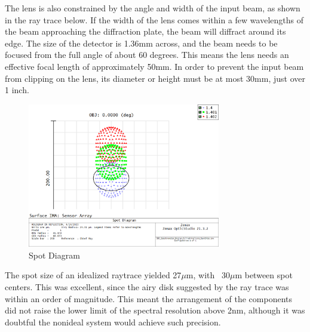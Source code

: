 The lens is also constrained by the angle and width of the input beam, as shown in the ray trace below. If the width of the lens comes within a few wavelengths of the beam approaching the diffraction plate, the beam will diffract around its edge. The size of the detector is 1.36mm across, and the beam needs to be focused from the full angle of about 60 degrees. This means the lens needs an effective focal length of approximately 50mm. In order to prevent the input beam from clipping on the lens, its diameter or height must be at most 30mm, just over 1 inch. 

\begin{figure}[H]
    \caption{Spot Diagram}
    \centering
    \includegraphics[width=0.75\textwidth]{images/SpotDiagram.png}
\end{figure}

The spot size of an idealized raytrace yielded 27$\mu$m, with ~30$\mu$m between spot centers. This was excellent, since the airy disk suggested by the ray trace was within an order of magnitude. This meant the arrangement of the components did not raise the lower limit of the spectral resolution above 2nm, although it was doubtful the nonideal system would achieve such precision.

